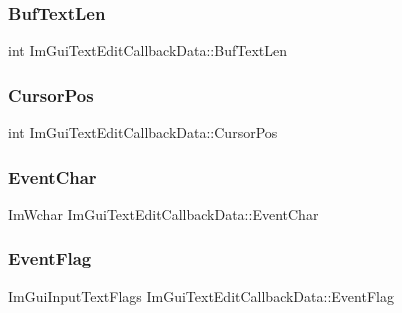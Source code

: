 \subsubsection{\texorpdfstring{Buf\+Text\+Len}{BufTextLen}}
{\footnotesize\ttfamily int Im\+Gui\+Text\+Edit\+Callback\+Data\+::\+Buf\+Text\+Len}

\hypertarget{struct_im_gui_text_edit_callback_data_aded0e6e87c2dcb66546ae6298e5a8a01}{}\label{struct_im_gui_text_edit_callback_data_aded0e6e87c2dcb66546ae6298e5a8a01} 
\subsubsection{\texorpdfstring{Cursor\+Pos}{CursorPos}}
{\footnotesize\ttfamily int Im\+Gui\+Text\+Edit\+Callback\+Data\+::\+Cursor\+Pos}

\hypertarget{struct_im_gui_text_edit_callback_data_acda2ae8b38e0596adf2f01036ac06612}{}\label{struct_im_gui_text_edit_callback_data_acda2ae8b38e0596adf2f01036ac06612} 
\subsubsection{\texorpdfstring{Event\+Char}{EventChar}}
{\footnotesize\ttfamily Im\+Wchar Im\+Gui\+Text\+Edit\+Callback\+Data\+::\+Event\+Char}

\hypertarget{struct_im_gui_text_edit_callback_data_aee2fa13574284d68d4025a26d32eba55}{}\label{struct_im_gui_text_edit_callback_data_aee2fa13574284d68d4025a26d32eba55} 
\subsubsection{\texorpdfstring{Event\+Flag}{EventFlag}}
{\footnotesize\ttfamily Im\+Gui\+Input\+Text\+Flags Im\+Gui\+Text\+Edit\+Callback\+Data\+::\+Event\+Flag}

\hypertarget{struct_im_gui_text_edit_callback_data_a476e640ad7f2f18ae5518dbc7cc33c55}{}\label{struct_im_gui_text_edit_callback_data_a476e640ad7f2f18ae5518dbc7cc33c55} 

